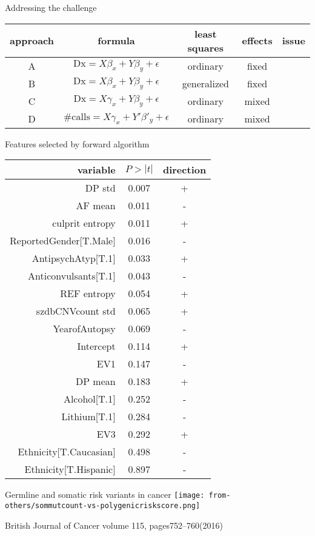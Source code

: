 \documentclass{beamer}
\begin{document}
\begin{frame}{Addressing the challenge}
\begin{tabular}{cccc}
approach & formula & least squares & effects & issue \\
\hline
A & \(\mathrm{Dx} = X\beta_x + Y\beta_y + \epsilon\) & ordinary & fixed \\
B &\(\mathrm{Dx} = X\beta_x + Y\beta_y + \epsilon\) & generalized & fixed \\
C & \(\mathrm{Dx} = X\gamma_x + Y\beta_y + \epsilon\) & ordinary & mixed\\
D & \(\mathrm{\#calls} = X\gamma_x + Y'\beta'_y + \epsilon\) & ordinary & mixed\\
\end{tabular}
\end{frame}

\begin{frame}{Features selected by forward algorithm}
\tiny
\begin{tabular}{rcc}
	variable & \(P>|t|\) & direction \\
\hline
DP std & 0.007 & + \\
AF mean & 0.011 & - \\
culprit entropy & 0.011 & + \\
ReportedGender[T.Male] & 0.016 & - \\
AntipsychAtyp[T.1] & 0.033 & + \\
Anticonvulsants[T.1] & 0.043 & - \\
REF entropy & 0.054 & + \\
szdbCNVcount std & 0.065 & + \\
YearofAutopsy & 0.069 & - \\
Intercept & 0.114 & + \\
EV1 & 0.147 & - \\
DP mean & 0.183 & + \\
Alcohol[T.1] & 0.252 & - \\
Lithium[T.1] & 0.284 & - \\
EV3 & 0.292 & + \\
Ethnicity[T.Caucasian] & 0.498 & - \\
Ethnicity[T.Hispanic] & 0.897 & - \\
\end{tabular}
\end{frame}

\begin{frame}{Germline and somatic risk variants in cancer}
\texttt{[image: from-others/sommutcount-vs-polygenicriskscore.png]}

\tiny
British Journal of Cancer volume 115, pages752–760(2016)
\end{frame}


\begin{columns}[t]
\begin{column}{0.5\textwidth}

\end{column}

\begin{column}{0.5\textwidth}

\end{column}
\end{columns}
\end{document}
